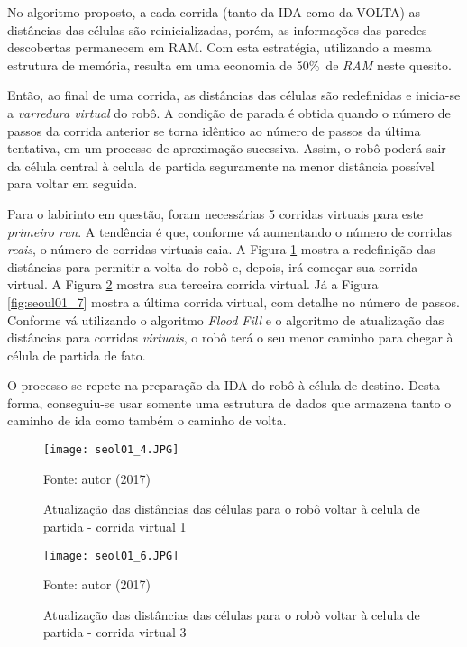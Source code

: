 No algoritmo proposto, a cada corrida (tanto da IDA como da VOLTA) as distâncias das células são reinicializadas, porém, as informações das paredes descobertas permanecem em RAM. Com esta estratégia, utilizando a mesma estrutura de memória, resulta em uma economia de 50\%\ de \emph{RAM} neste quesito.

Então, ao final de uma corrida, as distâncias das células são redefinidas e inicia-se a \emph{varredura virtual} do robô. A condição de parada é obtida quando o número de passos da corrida anterior se torna idêntico ao número de passos da última tentativa, em um processo de aproximação sucessiva. Assim, o robô poderá sair da célula central à celula de partida seguramente na menor distância possível para voltar em seguida. 

Para o labirinto em questão, foram necessárias 5 corridas virtuais para este \emph{primeiro run}. A tendência é que, conforme vá aumentando o número de corridas \emph{reais}, o número de corridas virtuais caia. A Figura \ref{fig:seoul01_4} mostra a redefinição das distâncias para permitir a volta do robô e, depois, irá começar sua corrida virtual. A Figura \ref{fig:seoul01_6} mostra sua terceira corrida virtual. Já a Figura \ref{fig:seoul01_7} mostra a última corrida virtual, com detalhe no número de passos. Conforme vá utilizando o algoritmo \emph{Flood Fill} e o algoritmo de atualização das distâncias para corridas \emph{virtuais}, o robô terá o seu menor caminho para chegar à célula de partida de fato.

O processo se repete na preparação da IDA do robô à célula de destino. Desta forma, conseguiu-se usar somente uma estrutura de dados que armazena tanto o caminho de ida como também o caminho de volta.

\begin{figure}[!htb]
	\caption{\label{fig:seoul01_4}Atualização das distâncias das células para o robô voltar à celula de partida - corrida virtual 1}
	\begin{center}
		\texttt{[image: seol01\_4.JPG]}
	\end{center}
	\centering
	\small Fonte: autor (2017)
\end{figure}
\begin{figure}[!htb]
	\caption{\label{fig:seoul01_6}Atualização das distâncias das células para o robô voltar à celula de partida - corrida virtual 3}
	\begin{center}
		\texttt{[image: seol01\_6.JPG]}
	\end{center}
	\centering
	\small Fonte: autor (2017)
\end{figure}

